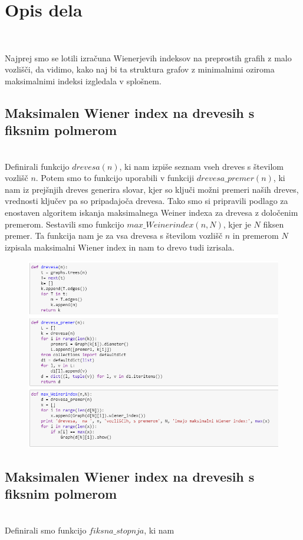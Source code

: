 \documentclass[12pt,a4paper]{amsart}
\theoremstyle{definition} %
\theoremstyle{plain} %
\begin{document}
\section{Opis dela}

\

Najprej smo se lotili izračuna Wienerjevih indeksov na preprostih grafih z malo vozlišči, da vidimo, kako naj bi ta struktura grafov 
z minimalnimi oziroma maksimalnimi indeksi izgledala v splošnem. 

\subsection{Maksimalen Wiener index na drevesih s fiksnim polmerom}
\
\\
Definirali funkcijo $drevesa(n)$, ki nam izpiše seznam vseh dreves s številom vozlišč $n$. Potem smo to funkcijo uporabili v 
funkciji $drevesa\_premer(n)$, ki nam iz prejšnjih dreves generira slovar, kjer so ključi možni premeri naših dreves, vrednosti ključev pa so pripadajoča drevesa. Tako smo si pripravili podlago za enostaven algoritem iskanja maksimalnega Weiner indexa za drevesa z določenim premerom. 
Sestavili smo funkcijo $max\_Weinerindex(n,N)$, kjer je $N$ fiksen premer. Ta funkcija nam je za vsa drevesa s številom vozlišč $n$ in premerom $N$ izpisala maksimalni Wiener index in nam to drevo tudi izrisala.
\begin{figure}[ht]
\centering
\includegraphics[width=1\textwidth]{slika1}
\end{figure}
\pagebreak

\subsection{Maksimalen Wiener index na drevesih s fiksnim polmerom}
\
\\
Definirali smo funkcijo $fiksna\_stopnja$, ki nam
\end{document}
